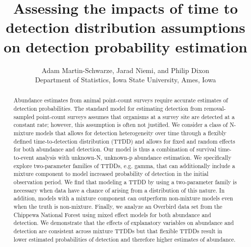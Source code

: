 \documentclass[12pt]{article}
\title{Assessing the impacts of time to detection distribution assumptions on detection probability estimation}
\author{Adam Martin-Schwarze, Jarad Niemi, and Philip Dixon\\
Department of Statistics, Iowa State University, Ames, Iowa}
\begin{document}
\maketitle
\newpage


\begin{abstract}

Abundance estimates from animal point-count surveys require accurate estimates of detection probabilities.  
The standard model for estimating detection from removal-sampled point-count surveys assumes that organisms at a survey site are detected at a constant rate; however, this assumption is often not justified.  
We consider a class of N-mixture models that allows for detection heterogeneity over time through a flexibly defined time-to-detection distribution (TTDD) and allows for fixed and random effects for both abundance and detection.
Our model is thus a combination of survival time-to-event analysis with unknown-N, unknown-p abundance estimation.  
We specifically explore two-parameter families of TTDDs, e.g. gamma, that can additionally include a mixture component to model increased probability of detection in the initial observation period.
We find that modeling a TTDD by using a two-parameter family is necessary when data have a chance of arising from a distribution of this nature.
In addition, models with a mixture component can outperform non-mixture models even when the truth is non-mixture.  
Finally, we analyze an Overbird data set from the Chippewa National Forest using mixed effect models for both abundance and detection.
We demonstrate that the effects of explanatory variables on abundance and detection are consistent across mixture TTDDs but that flexible TTDDs result in lower estimated probabilities of detection and therefore higher estimates of abundance. 

\end{abstract}
\end{document}
